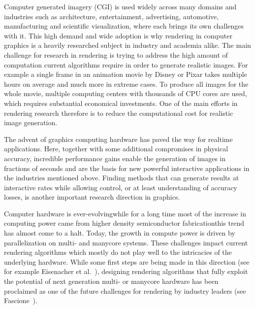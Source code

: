 Computer generated imagery (CGI) is used widely across many domains and industries such as architecture, entertainment, advertising, automotive, manufacturing and scientific visualization, where each brings its own challenges with it. This high demand and wide adoption is why rendering in computer graphics is a heavily researched subject in industry and academia alike. The main challenge for research in rendering is trying to address the high amount of computation current algorithms require in order to generate realistic images. For example a single frame in an animation movie by Disney or Pixar takes multiple hours on average and much more in extreme cases. To produce all images for the whole movie, multiple computing centers with thousands of CPU cores are used, which requires substantial economical investments. One of the main efforts in rendering research therefore is to reduce the computational cost for realistic image generation.

The advent of graphics computing hardware has paved the way for realtime applications. Here, together with some additional compromises in physical accuracy, incredible performance gains enable the generation of images in fractions of seconds and are the basis for new powerful interactive applications in the industries mentioned above. Finding methods that can generate results at interactive rates while allowing control, or at least understanding of accuracy losses, is another important research direction in graphics.

Computer hardware is ever-evolving\mydash while for a long time most of the increase in computing power came from higher density semiconductor fabrication\mydash this trend has almost come to a halt. Today, the growth in compute power is driven by parallelization on multi- and manycore systems. These challenges impact current rendering algorithms which mostly do not play well to the intricacies of the underlying hardware. While some first steps are being made in this direction (see for example Eisenacher et al.~\cite{Eisenacher13}), designing rendering algorithms that fully exploit the potential of next generation multi- or manycore hardware has been proclaimed as one of the future challenges for rendering by industry leaders (see Fascione~\cite{Fascione15}).

